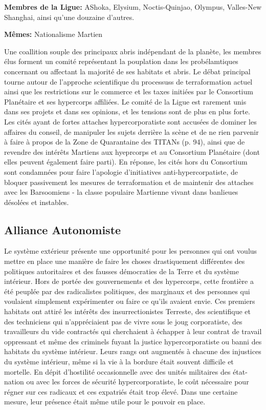 \textbf{Membres de la Ligue:} AShoka, Elysium, Noctis-Quinjao, Olympus, Valles-New Shanghai, ainsi qu'une douzaine d'autres. 

\textbf{Mêmes:} Nationalisme Martien 

Une coallition souple des principaux abris indépendant de la planète, les membres élus forment un comité représentant la pouplation dans les probélamtiques concernant ou affectant la majorité de ses habitats et abris. Le débat principal tourne autour de l'approche scientifique du processuss de terraformation actuel ainsi que les restrictions sur le commerce et les taxes initiées par le Consortium Planétaire et ses hypercorps affiliées. Le comité de la Ligue est rarement unis dans ses projets et dans ses opinions, et les tensions sont de plus en plus forte. Les cités ayant de fortes attaches hypercorporatiste sont accusées de dominer les affaires du conseil, de manipuler les sujets derrière la scène et de ne rien parvenir à faire à propos  de la Zone de Quarantaine des TITANs (p. 94), ainsi que de revendre des intérêts Martiens aux hyeprcorps et au Consortium Planétaire (dont elles peuvent également faire parti). En réponse, les cités hors du Consortium sont condamnées pour faire l'apologie d'initiatives anti-hypercorpatiste, de bloquer passivement les mesures de terraformation et de maintenir des attaches avec les Barsoomiens - la classe populaire Martienne vivant dans banlieues désolées et instables. 

\subsection{Alliance Autonomiste} \label{sec:autonomist-alliance} 

Le système extérieur présente une opportunité pour les personnes qui ont voulus mettre en place une manière de faire les choses drastiquement différentes des politiques autoritaires et des fausses démocraties de la Terre et du système intérieur. Hors de portée des gouvernements et des hypercorps, cette frontière a été peuplée par des radicalistes politiques, des marginaux et des personnes qui voulaient simplement expérimenter ou faire ce qu'ils avaient envie. Ces premiers habitats ont attiré les intérêts des insurrectionistes Terreste, des scientifique et des techniciens qui n'appréciaient pas de vivre sous le joug corporatiste, des travailleurs du vide contractés qui cherchaient à échapper à leur contrat de travail oppressant et même des criminels fuyant la justice hypercorporatiste ou banni des habitats du système intérieur. Leurs rangs ont augmentés à chacune des injustices du système intérieur, même si la vie à la bordure était souvent difficile et mortelle. En dépit d'hostilité occasionnelle avec des unités militaires des état-nation ou avec les forces de sécurité hypercorporatiste, le coût nécessaire pour régner sur ces radicaux et ces expatriés était trop élevé. Dans une certaine mesure, leur présence était même utile pour le pouvoir en place. 

